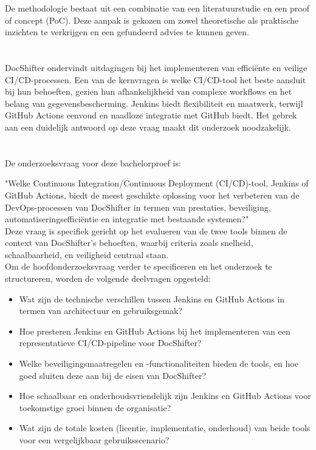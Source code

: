 De methodologie bestaat uit een combinatie van een literatuurstudie en een proof of concept (PoC). Deze aanpak is gekozen om zowel theoretische als praktische inzichten te verkrijgen en een gefundeerd advies te kunnen geven.


\section{}%
\label{sec:probleemstelling}

DocShifter ondervindt uitdagingen bij het implementeren van efficiënte en veilige CI/CD-processen. Een van de kernvragen is welke CI/CD-tool het beste aansluit bij hun behoeften, gezien hun afhankelijkheid van complexe workflows en het belang van gegevensbescherming. Jenkins biedt flexibiliteit en maatwerk, terwijl GitHub Actions eenvoud en naadloze integratie met GitHub biedt. Het gebrek aan een duidelijk antwoord op deze vraag maakt dit onderzoek noodzakelijk.

\section{}%
\label{sec:onderzoeksvraag}

De onderzoeksvraag voor deze bachelorproef is:

"Welke Continuous Integration/Continuous Deployment (CI/CD)-tool, Jenkins of GitHub Actions, biedt de meest geschikte oplossing voor het verbeteren van de DevOps-processen van DocShifter in termen van prestaties, beveiliging, automatiseringsefficiëntie en integratie met bestaande systemen?"
\\
Deze vraag is specifiek gericht op het evalueren van de twee tools binnen de context van DocShifter’s behoeften, waarbij criteria zoals snelheid, schaalbaarheid, en veiligheid centraal staan.
\\
Om de hoofdonderzoeksvraag verder te specificeren en het onderzoek te structureren, worden de volgende deelvragen opgesteld:
\\
\begin{itemize}
    \item Wat zijn de technische verschillen tussen Jenkins en GitHub Actions in termen van architectuur en gebruiksgemak?
    \item Hoe presteren Jenkins en GitHub Actions bij het implementeren van een representatieve CI/CD-pipeline voor DocShifter?
    \item Welke beveiligingsmaatregelen en -functionaliteiten bieden de tools, en hoe goed sluiten deze aan bij de eisen van DocShifter?
    \item Hoe schaalbaar en onderhoudsvriendelijk zijn Jenkins en GitHub Actions voor toekomstige groei binnen de organisatie?
    \item Wat zijn de totale kosten (licentie, implementatie, onderhoud) van beide tools voor een vergelijkbaar gebruiksscenario?
\end{itemize}

